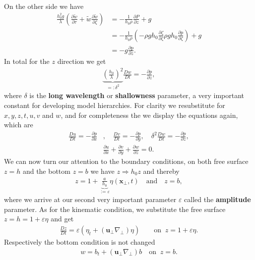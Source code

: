 On the other side we have
\begin{align}
    \frac{h_0^2g}{\lambda}\left( \frac{\partial \tilde{w}}{\partial \tau}
    + \tilde{w}\frac{\partial \tilde{w}}{\partial \zeta} \right)
    &=
    -\frac{1}{h_0\rho} \frac{\partial P}{\partial z} +g \\
    &=-\frac{1}{h_0\rho}(-\rho gh_0 \frac{\partial \zeta}{\partial \zeta}
    \rho gh_0
    \frac{\partial p}{\partial \zeta} ) + g  \\
    &= -g \frac{\partial p}{\partial z}.
\end{align}
In total for the $z$ direction we get
\begin{align}
   \underbrace{\left( \frac{h_0}{\lambda} \right)^2}_{=: \delta^2}
    \frac{Dw}{Dt} = -\frac{\partial p}{\partial z},
\end{align}
where $\delta$ is the \textbf{long wavelength} or \textbf{shallowness}
parameter, a very important constant for developing model hierarchies. For
clarity we resubstitute for $x, y, z, t, u, v$ and $w$, and for completeness
the we display the equations again, which are
\begin{align}\label{eq:nondim-motion}
    \frac{Du}{Dt} = - \frac{\partial p}{\partial x}&, \quad
    \frac{Dv}{Dt} = - \frac{\partial p}{\partial y}, \quad
    \delta^2\frac{Dw}{Dt} = - \frac{\partial p}{\partial z}, \\
    &\frac{\partial u}{\partial x} + \frac{\partial v}{\partial y}
    +\frac{\partial w}{\partial z}  = 0.
\end{align}
We can now turn our attention to the boundary conditions, on both free
surface $z=h$ and the bottom $z=b$ we have $z \Rightarrow h_0 z$ and thereby
\begin{align}
    z = 1+
    \underbrace{\frac{a}{h_0}}_{:=\varepsilon}\eta(\mathbf{x}_\perp,t) \quad
    \text{and}\quad z= b,
\end{align}
where we arrive at our second very important parameter $\varepsilon$ called
the \textbf{amplitude} parameter. As for the kinematic condition, we
substitute the free surface $z=h = 1+\varepsilon \eta$ and get
\begin{align}
    \frac{Dz}{Dt} = \varepsilon\left(\eta_t + (\mathbf{u}_\perp
        \nabla_\perp)\eta\right) \qquad \text{on}\;\; z= 1+\varepsilon \eta.
\end{align}
Respectively the bottom condition is not changed
\begin{align}
    w = b_t + (\mathbf{u}_\perp \nabla_\perp) b \quad \text{on}\;\; z= b.
\end{align}
